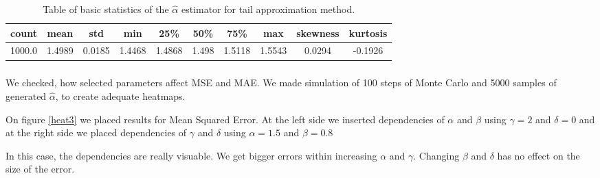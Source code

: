 \documentclass{article}
\begin{document}
		\begin{table}[H]
			\centering
			\begin{tabular}{|c|c|c|c|c|c|c|c|c|c|}
				\hline
				count &      mean &       std &       min &       25\% &      50\% &     75\% & max & skewness & kurtosis
				\\\hline
				1000.0 &  1.4989 &  0.0185 &  1.4468 &  1.4868 &  1.498 &  1.5118 &  1.5543 & 0.0294 & -0.1926\\\hline
			\end{tabular}
			\caption{Table of basic statistics of the $\hat\alpha$ estimator for tail approximation method.}\label{tabelka2}
		\end{table}
	
		\subsubsection{}
		We checked, how selected parameters affect MSE and MAE. We made simulation of 100 steps of Monte Carlo and 5000 samples of generated $\hat\alpha$, to create adequate heatmaps.
		
		On figure \ref{heat3} we placed results for Mean Squared Error. At the left side we inserted dependencies of $\alpha$ and $\beta$ using $\gamma=2$ and $\delta=0$ and at the right side we placed dependencies of $\gamma$ and $\delta$ using $\alpha=1.5$ and $\beta=0.8$
		
		In this case, the dependencies are really visuable. We get bigger errors within increasing $\alpha$ and $\gamma$. Changing $\beta$ and $\delta$ has no effect on the size of the error.
		
\end{document}
